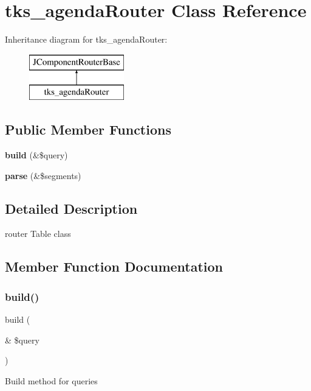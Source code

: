 \section{tks\+\_\+agenda\+Router Class Reference}
\label{classtks__agenda_router}
Inheritance diagram for tks\+\_\+agenda\+Router\+:\begin{figure}[H]
\begin{center}
\leavevmode
\includegraphics[height=2.000000cm]{classtks__agenda_router}
\end{center}
\end{figure}
\subsection*{Public Member Functions}
\begin{DoxyCompactItemize}
\item 
\textbf{ build} (\&\$query)
\item 
\textbf{ parse} (\&\$segments)
\end{DoxyCompactItemize}


\subsection{Detailed Description}
router Table class 

\subsection{Member Function Documentation}
\mbox{\label{classtks__agenda_router_a43dc8d89160d658bba57c6253329a987}} 
\subsubsection{build()}
{\footnotesize\ttfamily build (\begin{DoxyParamCaption}\item[{\&}]{\$query }\end{DoxyParamCaption})}

Build method for queries


